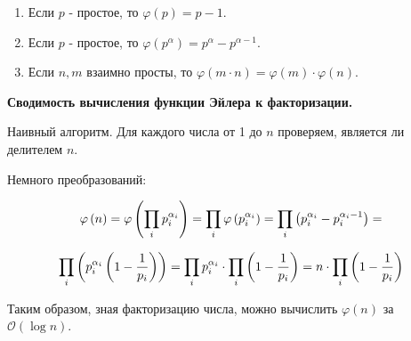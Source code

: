 \begin{enumerate}
    \item Если $p$ - простое, то $\varphi(p) = p - 1$.
    \item Если $p$ - простое, то $\varphi(p^\alpha) = p^\alpha - p^{\alpha - 1}$.
    \item Если $n, m$ взаимно просты, то $\varphi(m \cdot n) = \varphi(m) \cdot \varphi(n)$. 
\end{enumerate}

\textbf{Сводимость вычисления функции Эйлера к факторизации.}

Наивный алгоритм. Для каждого числа от 1 до $n$ проверяем, является ли делителем $n$.

Немного преобразований:

$$\varphi \left({n}\right) = \varphi \left({\prod_{i}{p_{i}^{\alpha_i}}}\right) = \prod_{i}\varphi\left({p^{\alpha_i}_{i}}\right) = \prod_{i}\left({p^{\alpha_i}_{i} - p^{\alpha_i - 1}_{i}}\right) = $$

$$\prod_{i}\left({p^{\alpha_i}_{i}\left({1 - \frac{1}{p_i}}\right)}\right)=\prod_{i}p^{\alpha_i}_{i} \cdot \prod_i\left({1 - \frac{1}{p_i}}\right) = n \cdot \prod_i\left({1 - \frac{1}{p_i}}\right)$$

Таким образом, зная факторизацию числа, можно вычислить $\varphi(n)$ за $\mathcal{O}(\log n)$.

\pagebreak